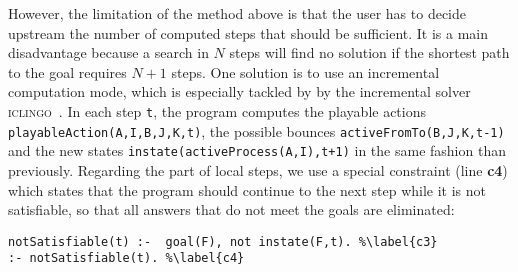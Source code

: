 However, the limitation of the method above is that the user has to decide upstream
the number of computed steps that should be sufficient.
It is a main disadvantage because a search in $N$ steps will find no solution
if the shortest path to the goal requires $N+1$ steps.
One solution is to use an incremental computation mode,
which is especially tackled by by the incremental solver \textsc{iclingo}~\cite{gebser2008user}.
%
In each step \texttt{t}, the program computes the playable actions \texttt{playableAction(A,I,B,J,K,t)}, the possible bounces \texttt{activeFromTo(B,J,K,t-1)}
and the new states \texttt{instate(activeProcess(A,I),t+1)}
in the same fashion than previously.
Regarding the part of local steps,
we use a special constraint (line \textbf{c4})
which states that the program should continue to the next step
while it is not satisfiable,
so that all answers that do not meet the goals are eliminated:
\begin{lstlisting}
notSatisfiable(t) :-  goal(F), not instate(F,t). %\label{c3}
:- notSatisfiable(t). %\label{c4}
\end{lstlisting}
